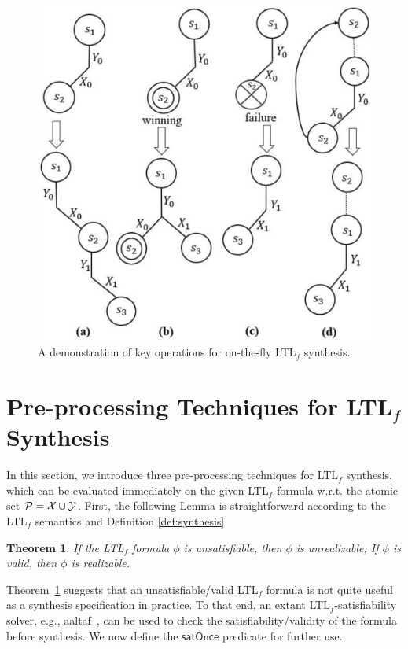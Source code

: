 \documentclass[letterpaper]{article} %
\newcommand{\ltlf}{\textsf{LTL}$_f$\xspace}
\newtheorem{theorem}{Theorem}
\def\satOnce{\mathsf{satOnce}\xspace}
\newcommand{\aaltaf}{{\sf aaltaf}\xspace}
\begin{document}
\begin{figure}
    \centering
    \includegraphics[scale=0.35]{demonstration.pdf}
    \caption{A demonstration of key operations for on-the-fly \ltlf synthesis.}
    \label{fig:demonstration}
\end{figure}




%
\section{Pre-processing Techniques for \ltlf Synthesis}
In this section, we introduce three pre-processing techniques for \ltlf synthesis, which can be evaluated immediately on the given \ltlf formula w.r.t. the atomic set $\mathcal{P}=\mathcal{X}\cup\mathcal{Y}$. First, the following Lemma is straightforward according to the \ltlf semantics and Definition \ref{def:synthesis}.

\begin{theorem}\label{thm:sat-syn}
	If the \ltlf formula $\phi$ is unsatisfiable, then $\phi$ is unrealizable; If $\phi$ is valid, then $\phi$ is realizable.
\end{theorem}
Theorem~\ref{thm:sat-syn} suggests that an unsatisfiable/valid \ltlf formula is not quite useful as a synthesis specification in practice. 
To that end, an extant \ltlf-satisfiability solver, e.g., \aaltaf~\cite{LRPZV19}, can be used to check the satisfiability/validity of the formula before synthesis. We now define the $\satOnce$ predicate for further use. 
\end{document}

